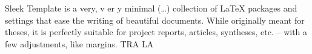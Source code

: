 \documentclass[a4paper, 12pt]{report}
\begin{document}
    Sleek Template is a very, v er y minimal (\ldots) collection of \LaTeX{} packages and settings that ease the writing of beautiful documents. While originally meant for theses, it is perfectly suitable for project reports, articles, syntheses, etc. -- with a few adjustments, like margins.
TRA LA
\end{document}
